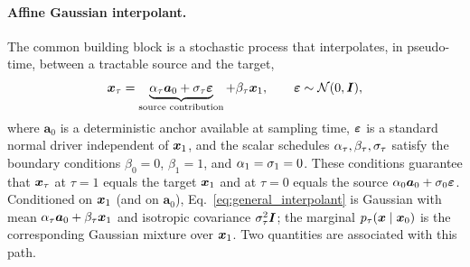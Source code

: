 \paragraph{Affine Gaussian interpolant.}
The common building block is a stochastic process that interpolates, in pseudo-time, between a tractable source and the target,
\begin{align}\label{eq:general_interpolant}
    \boldsymbol{x}_\tau = \underbrace{\alpha_\tau \bm{a}_0 + \sigma_\tau \bm{\varepsilon}}_{\text{source contribution}} + \beta_\tau \boldsymbol{x}_1,
    \qquad \bm{\varepsilon} \sim \mathcal{N}(0,\bm{I}),
\end{align}
where $\bm{a}_0$ is a deterministic anchor available at sampling time, $\bm{\varepsilon}$ is a standard normal driver independent of $\boldsymbol{x}_1$, and the scalar schedules $\alpha_\tau,\beta_\tau,\sigma_\tau$ satisfy the boundary conditions $\beta_0=0$, $\beta_1=1$, and $\alpha_1=\sigma_1=0$. These conditions guarantee that $\boldsymbol{x}_\tau$ at $\tau=1$ equals the target $\boldsymbol{x}_1$ and at $\tau=0$ equals the source $\alpha_0\bm a_0 + \sigma_0\bm{\varepsilon}$. Conditioned on $\boldsymbol{x}_1$ (and on $\bm{a}_0$), Eq.~\eqref{eq:general_interpolant} is Gaussian with mean $\alpha_\tau\bm{a}_0 + \beta_\tau\boldsymbol{x}_1$ and isotropic covariance $\sigma_\tau^2\bm{I}$; the marginal $p_\tau(\boldsymbol{x}\mid\boldsymbol{x}_0)$ is the corresponding Gaussian mixture over $\boldsymbol{x}_1$. Two quantities are associated with this path.

